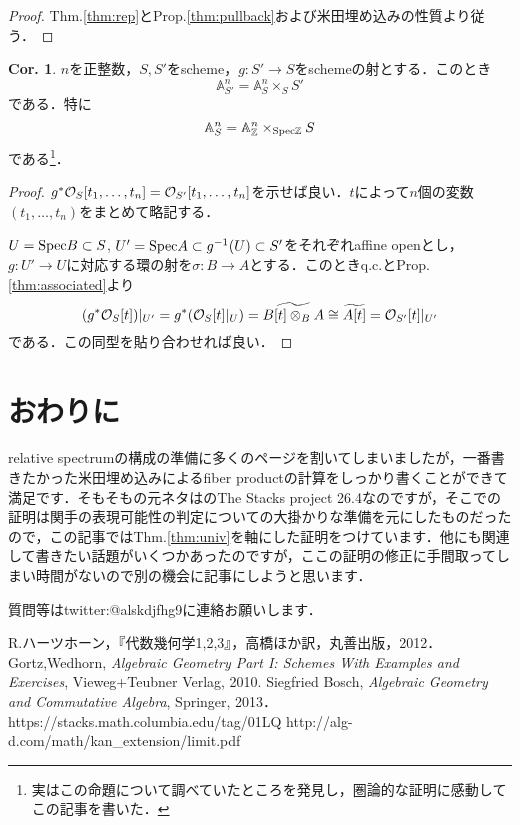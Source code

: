 \documentclass[dvipdfmx,b5paper,papersize]{jsarticle}
\theoremstyle{definition}
\newtheorem{cor}[thm]{Cor.}
\begin{document}
\begin{proof}
  Thm.\ref{thm:rep}とProp.\ref{thm:pullback}および米田埋め込みの性質より従う．
\end{proof}
\begin{cor}
  $n$を正整数，$S,S'$をscheme，$g:S' \to S$をschemeの射とする．このとき
  \[
    \mathbb{A}^n_{S'}=\mathbb{A}^n_S \times_S S'
  \]
  である．特に
  \[
    \mathbb{A}^n_S=\mathbb{A}^n_{\mathbb{Z}} \times_{{\rm Spec}{\mathbb{Z}}} S
  \]
  である\footnote{実はこの命題について調べていたところ\cite{stacks_project}を発見し，圏論的な証明に感動してこの記事を書いた．}．

\end{cor}
\begin{proof}
  $g^*{{\cal{O}}_S[t_1,\dots ,t_n]}={{\cal{O}}_{S'}[t_1,\dots ,t_n]}$を示せば良い．$t$によって$n$個の変数$(t_1,\dots,t_n)$をまとめて略記する．

  $U={\rm Spec}B \subset S$,
  $U'={\rm Spec}A \subset g^{-1}(U) \subset S'$をそれぞれaffine openとし，$g:U' \to U$に対応する環の射を$\sigma:B \to A$とする．このときq.c.とProp.\ref{thm:associated}より
  \[
  (g^*{\cal{O}}_S[t])|_{U'}=g^*({\cal{O}}_S[t]|_U)={\widetilde {B[t] \otimes_B A}}\cong {\widetilde{A[t]}}={\cal{O}}_{S'}[t]|_{U'}
  \]
  である．この同型を貼り合わせれば良い．
\end{proof}

\section{おわりに}
relative spectrumの構成の準備に多くのページを割いてしまいましたが，一番書きたかった米田埋め込みによるfiber productの計算をしっかり書くことができて満足です．そもそもの元ネタは\cite{stacks_project}のThe Stacks project 26.4なのですが，そこでの証明は関手の表現可能性の判定についての大掛かりな準備を元にしたものだったので，この記事ではThm.\ref{thm:univ}を軸にした証明をつけています．他にも関連して書きたい話題がいくつかあったのですが，ここの証明の修正に手間取ってしまい時間がないので別の機会に記事にしようと思います．

質問等はtwitter:@alskdjfhg9に連絡お願いします．
\begin{thebibliography}{2}
 R.ハーツホーン，『代数幾何学1,2,3』，高橋ほか訳，丸善出版，2012．
 Gortz,Wedhorn, {\sl Algebraic Geometry
Part I: Schemes With Examples and Exercises}, Vieweg+Teubner Verlag, 2010.
 Siegfried Bosch, {\sl Algebraic Geometry and Commutative Algebra}, Springer, 2013．
 {https://stacks.math.columbia.edu/tag/01LQ
}
  {http://alg-d.com/math/kan\_extension/limit.pdf}
\end{thebibliography}
\end{document}
